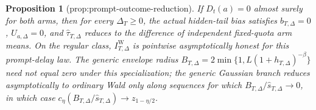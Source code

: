 \documentclass{article}
\newtheorem{proposition}{Proposition}
\begin{document}
\begin{proposition}[prop:prompt-outcome-reduction]\label{prop:prompt-outcome-reduction}
If \(D_t(a)=0\) almost surely for both arms, then for every \(\Delta_T\geq0\), the actual hidden-tail bias satisfies \(b_{T,\Delta}=0\), \(U_{a,\Delta}=0\), and \(\widehat\tau_{T,\Delta}\) reduces to the difference of independent fixed-quota arm means. On the regular class, \(I_{T,\Delta}^{\mathrm W}\) is pointwise asymptotically honest for this prompt-delay law. The generic envelope radius \(B_{T,\Delta}=2\min\{1,L(1+h_{T,\Delta})^{-\beta}\}\) need not equal zero under this specialization; the generic Gaussian branch reduces asymptotically to ordinary Wald only along sequences for which \(B_{T,\Delta}/\widehat s_{T,\Delta}\to0\), in which case \(c_\eta(B_{T,\Delta}/\widehat s_{T,\Delta})\to z_{1-\eta/2}\).
\end{proposition}
\end{document}
